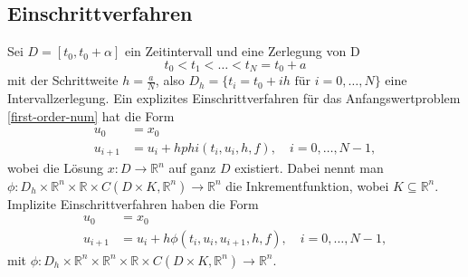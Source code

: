 \subsection{Einschrittverfahren}
\begin{definition}
    Sei $D=[t_0,t_0+\alpha]$ ein Zeitintervall und eine Zerlegung von D
    \[
        t_0 < t_1 < \dots < t_N = t_0 + a
    \]
    mit der Schrittweite $h=\frac{a}{N}$, also $D_h=\{t_i=t_0 + ih \text{ für } i=0, \dots,N\}$ eine Intervallzerlegung.
    Ein explizites Einschrittverfahren für das Anfangswertproblem \eqref{first-order-num} hat die Form
    \begin{align}
        u_0 &= x_0 \nonumber \\
        u_{i+1} &= u_i + h phi(t_i,u_i,h,f), \quad i=0,\dots,N-1, \label{eq:6}
    \end{align}
    wobei die Lösung $x:D \rightarrow \mathbb{R}^{n}$ auf ganz $D$ existiert.
    Dabei nennt man
    $\phi:D_h \times \mathbb{R}^n \times \mathbb{R} \times C(D \times K,\mathbb{R}^n) \rightarrow \mathbb{R}^n$ die
    Inkrementfunktion, wobei $K \subseteq \mathbb{R}^n$.
    Implizite Einschrittverfahren haben die Form
    \begin{align*}
        u_0 &= x_0\\
        u_{i+1} &= u_i + h\phi(t_i,u_i,u_{i+1},h,f), \quad i=0,\dots,N-1,
    \end{align*}
    mit $\phi:D_h \times \mathbb{R}^n \times \mathbb{R}^n \times \mathbb{R} \times C(D \times K,\mathbb{R}^n)
    \rightarrow \mathbb{R}^n$.
\end{definition}
